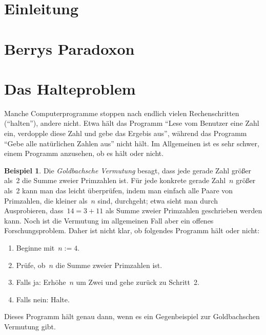 \documentclass[twoside]{../zirkelblatt1415}
\theoremstyle{definition}
\newtheorem{bsp}[defn]{Beispiel}
\theoremstyle{plain}
\theoremstyle{remark}
\newenvironment{listing}{
  \renewcommand*\theenumi{\arabic{enumi}}
  \renewcommand{\labelenumi}{\theenumi.}
  \begin{enumerate}\itemsep0em}{\end{enumerate}}
\begin{document}

{\renewcommand{\addvspace}[1]{\vskip0.6em}
\tableofcontents%
}

\section{Einleitung}


\section{Berrys Paradoxon}


\section{Das Halteproblem}

Manche Computerprogramme stoppen nach endlich vielen Rechenschritten
("`halten"'), andere nicht. Etwa hält das Programm "`Lese vom Benutzer eine
Zahl ein, verdopple diese Zahl und gebe das Ergebis aus"', während das Programm
"`Gebe alle natürlichen Zahlen aus"' nicht hält. Im Allgemeinen ist es sehr
schwer, einem Programm anzusehen, ob es hält oder nicht.

\begin{bsp}\label{bsp:unklares-programm}Die \emph{Goldbachsche Vermutung}
besagt, dass jede gerade Zahl
größer als~2 die Summe zweier Primzahlen ist. Für jede
konkrete gerade Zahl~$n$ größer als~2 kann man das leicht überprüfen, indem man
einfach alle Paare von Primzahlen, die kleiner als~$n$ sind, durchgeht; etwa
sieht man durch Ausprobieren, dass~$14 = 3 + 11$ als Summe zweier Primzahlen
geschrieben werden kann. Noch ist die Vermutung im allgemeinen Fall aber ein
offenes Forschungsproblem. Daher ist nicht klar, ob folgendes Programm hält
oder nicht:
\begin{listing}
\item[1.] Beginne mit~$n := 4$.
\item[2.] Prüfe, ob~$n$ die Summe zweier Primzahlen ist.
\item[3.] Falls ja: Erhöhe~$n$ um Zwei und gehe zurück zu Schritt~2.
\item[4.] Falls nein: Halte.
\end{listing}
Dieses Programm hält genau dann, wenn es ein Gegenbeispiel zur Goldbachschen
Vermutung gibt.
\end{bsp}
\end{document}
